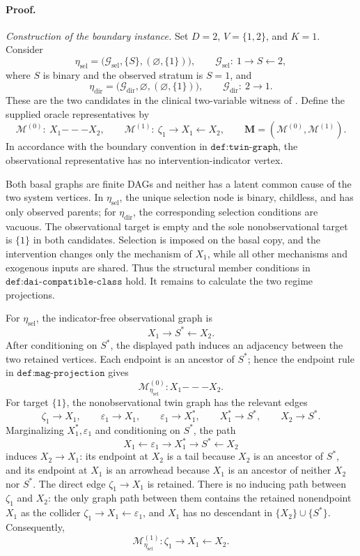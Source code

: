 \paragraph{Proof.}
\emph{Construction of the boundary instance.}
Set \(D=2\), \(V=\{1,2\}\), and \(K=1\).  Consider
\[
 \eta_{\mathrm{sel}}
 =\bigl(\mathcal G_{\mathrm{sel}},\{S\},(\varnothing,\{1\})\bigr),
 \qquad
 \mathcal G_{\mathrm{sel}}:\ 1\longrightarrow S\longleftarrow2,
\]
where \(S\) is binary and the observed stratum is \(S=1\), and
\[
 \eta_{\mathrm{dir}}
 =\bigl(\mathcal G_{\mathrm{dir}},\varnothing,(\varnothing,\{1\})\bigr),
 \qquad
 \mathcal G_{\mathrm{dir}}:\ 2\longrightarrow1.
\]
These are the two candidates in the clinical two-variable witness of
\cite{DaiEtAl2025SelectionIntervention}.  Define the supplied oracle representatives by
\[
 \mathcal M^{(0)}:\ X_1\mathbin{---}X_2,
 \qquad
 \mathcal M^{(1)}:\
 \zeta_1\longrightarrow X_1\longleftarrow X_2,
 \qquad
 \mathbf M=(\mathcal M^{(0)},\mathcal M^{(1)}).
 \tag{1}
\]
In accordance with the boundary convention in \(\texttt{def:twin-graph}\), the
observational representative has no intervention-indicator vertex.

Both basal graphs are finite DAGs and neither has a latent common cause of the two
system vertices.  In \(\eta_{\mathrm{sel}}\), the unique selection node is binary,
childless, and has only observed parents; for \(\eta_{\mathrm{dir}}\), the corresponding
selection conditions are vacuous.  The observational target is empty and the sole
nonobservational target is \(\{1\}\) in both candidates.  Selection is imposed on the
basal copy, and the intervention changes only the mechanism of \(X_1\), while all
other mechanisms and exogenous inputs are shared.  Thus the structural member
conditions in \(\texttt{def:dai-compatible-class}\) hold.  It remains to calculate the
two regime projections.

For \(\eta_{\mathrm{sel}}\), the indicator-free observational graph is
\[
 X_1\longrightarrow S^*\longleftarrow X_2.
\]
After conditioning on \(S^*\), the displayed path induces an adjacency between the
two retained vertices.  Each endpoint is an ancestor of \(S^*\); hence the endpoint
rule in \(\texttt{def:mag-projection}\) gives
\[
 \mathcal M_{\eta_{\mathrm{sel}}}^{(0)}:
 X_1\mathbin{---}X_2.
 \tag{2}
\]
For target \(\{1\}\), the nonobservational twin graph has the relevant edges
\[
 \zeta_1\to X_1,
 \qquad
 \varepsilon_1\to X_1,
 \qquad
 \varepsilon_1\to X_1^*,
 \qquad
 X_1^*\to S^*,
 \qquad
 X_2\to S^*.
 \tag{3}
\]
Marginalizing \(X_1^*,\varepsilon_1\) and conditioning on \(S^*\), the path
\[
 X_1\leftarrow\varepsilon_1\to X_1^*\to S^*\leftarrow X_2
\]
induces \(X_2\to X_1\): its endpoint at \(X_2\) is a tail because \(X_2\) is an
ancestor of \(S^*\), and its endpoint at \(X_1\) is an arrowhead because \(X_1\) is
an ancestor of neither \(X_2\) nor \(S^*\).  The direct edge
\(\zeta_1\to X_1\) is retained.  There is no inducing path between \(\zeta_1\) and
\(X_2\): the only graph path between them contains the retained nonendpoint
\(X_1\) as the collider \(\zeta_1\to X_1\leftarrow\varepsilon_1\), and \(X_1\)
has no descendant in \(\{X_2\}\cup\{S^*\}\).  Consequently,
\[
 \mathcal M_{\eta_{\mathrm{sel}}}^{(1)}:
 \zeta_1\longrightarrow X_1\longleftarrow X_2.
 \tag{4}
\]

